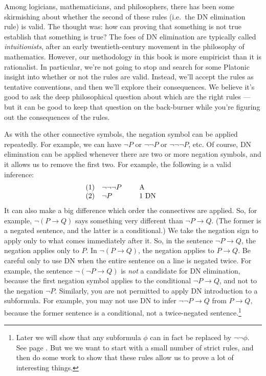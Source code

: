 Among logicians, mathematicians, and philosophers, there has been some
skirmishing about whether the second of these rules (i.e.\ the DN
elimination rule) is valid.  The thought was: how can proving that
something is not true establish that something is true?  The foes of
DN elimination are typically called {\it intuitionists}, after an
early twentieth-century movement in the philosophy of mathematics.
However, our methodology in this book is more empiricist than it is
rationalist.  In particular, we're not going to stop and search for
some Platonic insight into whether or not the rules are valid.
Instead, we'll accept the rules as tentative conventions, and then
we'll explore their consequences.  We believe it's good to ask the
deep philosophical question about which are the right rules --- but it
can be good to keep that question on the back-burner while you're
figuring out the consequences of the rules.

As with the other connective symbols, the negation symbol can be
applied repeatedly.  For example, we can have $\neg P$ or $\neg\neg P$
or $\neg\neg\neg P$, etc.  Of course, DN elimination can be applied
whenever there are two or more negation symbols, and it allows us to
remove the first two.  For example, the following is a valid
inference:
\[ \begin{array}{l >{$}p{1.5cm}<{$} p{2cm}}
     (1) & \neg\neg\neg P & A \\
     (2) & \neg P & 1 DN \end{array} \] It can also make a big
 difference which order the connectives are applied.  So, for example, $\neg (P\to Q)$ says something very different than $\neg P\to Q$.  (The former is a negated sentence, and the latter is a conditional.)  We take the negation sign to apply only to what comes immediately after it.  So, in the sentence $\neg P\to Q$, the negation applies only to $P$.  In $\neg (P\to Q)$, the negation applies to $P\to Q$.  Be careful only to use DN when the entire sentence on a line is negated twice.  For example, the sentence $\neg (\neg P\to Q)$ is {\it not} a candidate for DN elimination, because the first negation symbol applies to the conditional $\neg P\to Q$, and not to the negation $\neg P$.  Similarly, you are not permitted to apply DN introduction to a subformula.  For example, you may not use DN to infer $\neg\neg P\to Q$ from $P\to Q$, because the former sentence is a conditional, not a twice-negated sentence.\footnote{Later we will show that any subformula $\phi$ can in fact be replaced by $\neg\neg\phi$. See page \pageref{replacement}. But we we want to start with a small number of strict rules, and then do some work to show that these rules allow us to prove a lot of interesting things.}

